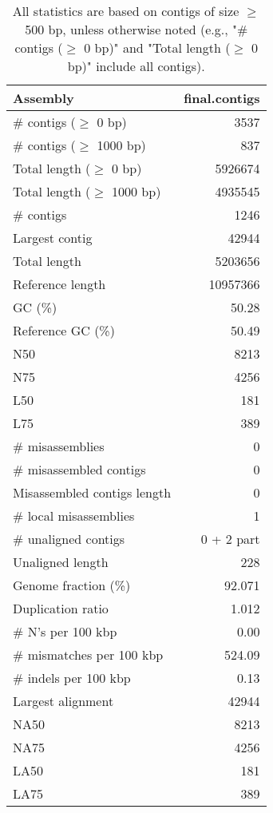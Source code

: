 \documentclass[12pt,a4paper]{article}
\begin{document}
\begin{table}[ht]
\begin{center}
\caption{All statistics are based on contigs of size $\geq$ 500 bp, unless otherwise noted (e.g., "\# contigs ($\geq$ 0 bp)" and "Total length ($\geq$ 0 bp)" include all contigs).}
\begin{tabular}{|l*{1}{|r}|}
\hline
Assembly & final.contigs \\ \hline
\# contigs ($\geq$ 0 bp) & 3537 \\ \hline
\# contigs ($\geq$ 1000 bp) & 837 \\ \hline
Total length ($\geq$ 0 bp) & 5926674 \\ \hline
Total length ($\geq$ 1000 bp) & 4935545 \\ \hline
\# contigs & 1246 \\ \hline
Largest contig & 42944 \\ \hline
Total length & 5203656 \\ \hline
Reference length & 10957366 \\ \hline
GC (\%) & 50.28 \\ \hline
Reference GC (\%) & 50.49 \\ \hline
N50 & 8213 \\ \hline
N75 & 4256 \\ \hline
L50 & 181 \\ \hline
L75 & 389 \\ \hline
\# misassemblies & 0 \\ \hline
\# misassembled contigs & 0 \\ \hline
Misassembled contigs length & 0 \\ \hline
\# local misassemblies & 1 \\ \hline
\# unaligned contigs & 0 + 2 part \\ \hline
Unaligned length & 228 \\ \hline
Genome fraction (\%) & 92.071 \\ \hline
Duplication ratio & 1.012 \\ \hline
\# N's per 100 kbp & 0.00 \\ \hline
\# mismatches per 100 kbp & 524.09 \\ \hline
\# indels per 100 kbp & 0.13 \\ \hline
Largest alignment & 42944 \\ \hline
NA50 & 8213 \\ \hline
NA75 & 4256 \\ \hline
LA50 & 181 \\ \hline
LA75 & 389 \\ \hline
\end{tabular}
\end{center}
\end{table}
\end{document}
